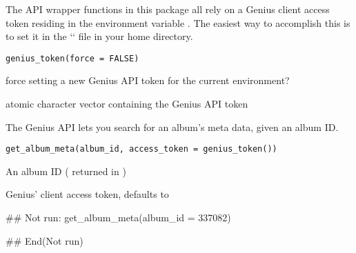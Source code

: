 \documentclass[a4paper]{book}
\begin{document}
%
\begin{Description}\relax
The API wrapper functions in this package all rely on a Genius client access token
residing in the environment variable . The
easiest way to accomplish this is to set it in the `` file in your
home directory.
\end{Description}
%
\begin{Usage}
\begin{verbatim}
genius_token(force = FALSE)
\end{verbatim}
\end{Usage}
%
\begin{Arguments}
\begin{ldescription}
\item[\code{force}] force setting a new Genius API token for the current environment?
\end{ldescription}
\end{Arguments}
%
\begin{Value}
atomic character vector containing the Genius API token
\end{Value}
%
\begin{Description}\relax
The Genius API lets you search for an album's meta data, given an album ID.
\end{Description}
%
\begin{Usage}
\begin{verbatim}
get_album_meta(album_id, access_token = genius_token())
\end{verbatim}
\end{Usage}
%
\begin{Arguments}
\begin{ldescription}
\item[\code{album\_id}] An album ID ( returned in )

\item[\code{access\_token}] Genius' client access token, defaults to 
\end{ldescription}
\end{Arguments}
%
\begin{Examples}
\begin{ExampleCode}
## Not run: 
get_album_meta(album_id = 337082)

## End(Not run)
\end{ExampleCode}
\end{Examples}
\end{document}

